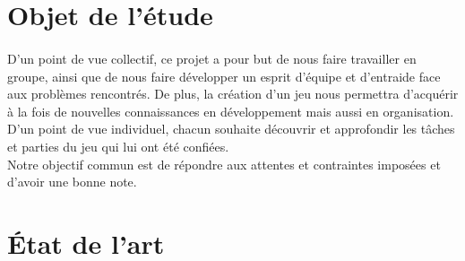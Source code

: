 \documentclass[12pt,a4paper]{article}
\begin{document}
\section{Objet de l'étude}
\paragraph{}
\normalsize
{
D'un point de vue collectif, ce projet a pour but de nous faire travailler en groupe, ainsi que de nous faire développer un esprit d’équipe et d’entraide face aux problèmes rencontrés. De plus, la création d’un jeu nous permettra d’acquérir à la fois de nouvelles connaissances en développement mais aussi en organisation. 
\vspace*{0.2cm}
\\
D'un point de vue individuel, chacun souhaite découvrir et approfondir les tâches et parties du jeu qui lui ont été confiées. 
\vspace*{0.2cm}
\\
Notre objectif commun est de répondre aux attentes et contraintes imposées et d’avoir une bonne note. }
\\

\section{État de l'art}
\end{document}
